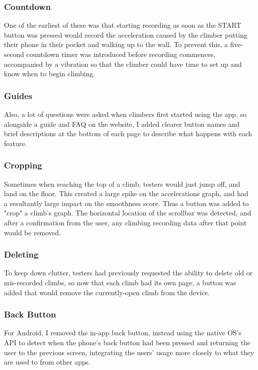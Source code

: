 \subsubsection{Countdown}
One of the earliest of these was that starting recording as soon as the START button was pressed would record the acceleration caused by the climber putting their phone in their pocket and walking up to the wall.
To prevent this, a five-second countdown timer was introduced before recording commences, accompanied by a vibration so that the climber could have time to set up and know when to begin climbing.

\subsubsection{Guides}
Also, a lot of questions were asked when climbers first started using the app, so alongside a guide and FAQ on the website, I added clearer button names and brief descriptions at the bottom of each page to describe what happens with each feature.


\subsubsection{Cropping}
Sometimes when reaching the top of a climb, testers would just jump off, and land on the floor.
This created a large spike on the accelerations graph, and had a resultantly large impact on the smoothness score.
Thus a button was added to "crop" a climb's graph.
The horizontal location of the scrollbar was detected, and after a confirmation from the user, any climbing recording data after that point would be removed.

\subsubsection{Deleting}
To keep down clutter, testers had previously requested the ability to delete old or mis-recorded climbs, so now that each climb had its own page, a button was added that would remove the currently-open climb from the device.


\subsubsection{Back Button}
For Android, I removed the in-app back button, instead using the native OS's API to detect when the phone's back button had been pressed and returning the user to the previous screen, integrating the users' usage more closely to what they are used to from other apps.



